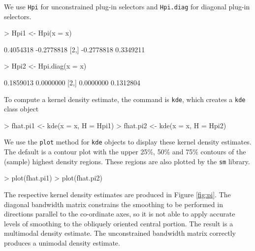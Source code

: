 \documentclass[a4paper,11pt]{article}
\let\code=\texttt
\let\pkg=\texttt
\begin{document}
We use \code{Hpi} for 
unconstrained plug-in selectors and \code{Hpi.diag} for diagonal plug-in selectors.
\begin{Schunk}
\begin{Sinput}
> Hpi1 <- Hpi(x = x)
\end{Sinput}
\begin{Soutput}
           [,1]       [,2]
[1,]  0.4054318 -0.2778818
[2,] -0.2778818  0.3349211
\end{Soutput}
\begin{Sinput}
> Hpi2 <- Hpi.diag(x = x)
\end{Sinput}
\begin{Soutput}
          [,1]      [,2]
[1,] 0.1859013 0.0000000
[2,] 0.0000000 0.1312804
\end{Soutput}
\end{Schunk}
To compute a kernel density estimate, the 
command is \code{kde}, which creates a \code{kde} class object
\begin{Schunk}
\begin{Sinput}
> fhat.pi1 <- kde(x = x, H = Hpi1)
> fhat.pi2 <- kde(x = x, H = Hpi2)
\end{Sinput}
\end{Schunk}
We use the \code{plot} method for \code{kde} objects to display these
kernel density estimates. The default is a contour plot with 
the upper 25\%, 50\% and 75\% contours of the 
(sample) highest density regions. %
These regions are also plotted by the \pkg{sm} library.
\begin{Schunk}
\begin{Sinput}
> plot(fhat.pi1)
> plot(fhat.pi2)
\end{Sinput}
\end{Schunk}
The respective kernel density estimates are produced in Figure \ref{fig:pi}.
The diagonal bandwidth matrix constrains the smoothing to be performed in directions
parallel to the co-ordinate axes, so it is not able to apply accurate levels
of smoothing to the obliquely oriented central portion. The result is a 
multimodal
density estimate. The unconstrained bandwidth matrix correctly produces 
a unimodal density estimate. 
\end{document}
